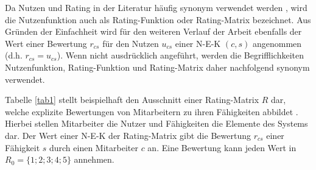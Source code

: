 Da Nutzen und Rating in der Literatur häufig synonym verwendet werden \cite[S. 11]{recommenderSystems:2016}, wird die Nutzenfunktion auch als Rating-Funktion \cite[S. 49]{adomavicius:inproceedings:2} oder Rating-Matrix \cite[S. 87]{ekstrand:article} bezeichnet.
Aus Gründen der Einfachheit wird für den weiteren Verlauf der Arbeit ebenfalls der Wert einer Bewertung $r_{cs}$ für den Nutzen $u_{cs}$ einer \ac{N-E-K} $(c,s)$ angenommen (d.h. $r_{cs} = u_{cs}$).
Wenn nicht ausdrücklich angeführt, werden die Begrifflichkeiten Nutzenfunktion, Rating-Funktion und Rating-Matrix daher nachfolgend synonym verwendet.



Tabelle \ref{tab1} stellt beispielhaft den Ausschnitt einer Rating-Matrix $R$ dar, welche explizite Bewertungen von Mitarbeitern zu ihren Fähigkeiten abbildet \cite[S. 735]{adomavicius:inproceedings}\cite[S. 16]{link:booklet}.
Hierbei stellen Mitarbeiter die Nutzer und Fähigkeiten die Elemente des Systems dar.
Der Wert einer \ac{N-E-K} der Rating-Matrix gibt die Bewertung $r_{cs}$ einer Fähigkeit $s$ durch einen Mitarbeiter $c$ an.
Eine Bewertung kann jeden Wert in $R_{0}=\{1;2;3;4;5\}$ annehmen.

